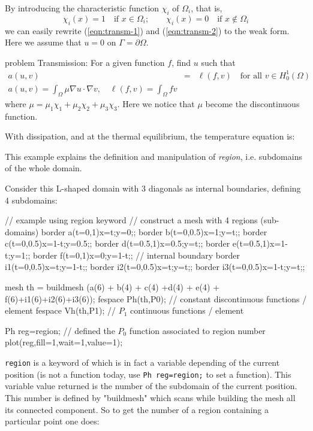 \documentclass[a4paper,twoside,12pt]{book}
\def\p{\partial}
\begin{document}
By introducing the characteristic function $\chi_i$ of $\Omega_i$, that is,
\begin{equation}
\chi_i(x)=1\quad\textrm{if }x\in \Omega_i;\qquad
\chi_i(x)=0\quad\textrm{if }x\not\in \Omega_i
\end{equation}
we can easily rewrite (\ref{eqn:transm-1}) and (\ref{eqn:transm-2})
to the weak form. Here we assume that $u=0$ on $\Gamma=\p\Omega$.

problem Transmission: For a given function $f$, find $u$ such that
\begin{eqnarray}
\label{eqn:transmission}
a(u,v)&=&\ell(f,v)\quad \textrm{for all }v\in H^1_0(\Omega)\\
a(u,v)=\int_{\Omega}\mu \nabla u\cdot \nabla v,\quad
\ell(f,v)=\int_{\Omega}fv\nonumber
\end{eqnarray}
where $\mu=\mu_1\chi_1+\mu_2\chi_2+\mu_3\chi_3$.
Here we notice that $\mu$ become the discontinuous function.

With dissipation, and at the thermal equilibrium, the temperature equation
is:

This example explains the definition and manipulation of \emph{region}, i.e.
 subdomains of the whole domain.

Consider this L-shaped domain with 3 diagonals as internal boundaries, defining
4 subdomains:

\bFF
//   example using region keyword
// construct a mesh with 4 regions (sub-domains)
border a(t=0,1){x=t;y=0;};
border b(t=0,0.5){x=1;y=t;};
border c(t=0,0.5){x=1-t;y=0.5;};
border d(t=0.5,1){x=0.5;y=t;};
border e(t=0.5,1){x=1-t;y=1;};
border f(t=0,1){x=0;y=1-t;};
//  internal boundary
border i1(t=0,0.5){x=t;y=1-t;};
border i2(t=0,0.5){x=t;y=t;};
border i3(t=0,0.5){x=1-t;y=t;};

mesh th = buildmesh (a(6) + b(4) + c(4) +d(4) + e(4) +
    f(6)+i1(6)+i2(6)+i3(6));
fespace Ph(th,P0);  // constant discontinuous functions / element
fespace Vh(th,P1);  // $P_1$ continuous functions / element

Ph reg=region; //  defined the $P_0$ function  associated to region number
plot(reg,fill=1,wait=1,value=1);
\eFF
{}

 \texttt{region}  is a keyword of \freefempp which is in fact a variable depending of
the current position (is not a function today, use \texttt{Ph reg=region;} to  set  a function).  This variable value returned is the number of the
subdomain of the current position.  This number is defined by "buildmesh" which scans while building the mesh all
its connected component.  So to get the number of a region containing a particular point
one does:
\bFF
\end{document}
